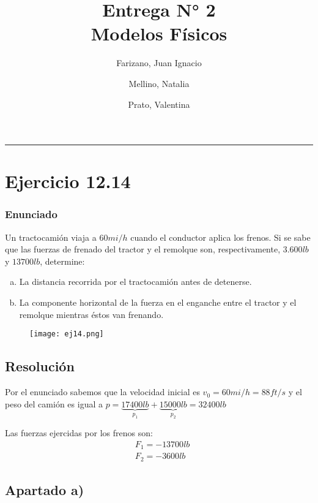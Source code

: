 \documentclass[11pt]{article}
\title{
  Entrega N° 2 \\
  \large Modelos Físicos
}
\author{
  Farizano, Juan Ignacio \\
  \and
  Mellino, Natalia \\
  \and
  Prato, Valentina
}
\date{}
\begin{document}
\maketitle
\noindent\rule{\textwidth}{1pt}

\section*{Ejercicio 12.14}

\subsubsection*{Enunciado}

Un tractocamión viaja a $60 mi/h$ cuando el conductor aplica los
frenos. Si se sabe que las fuerzas de frenado del tractor y el remolque son,
respectivamente, $3.600 lb$ y $13 700 lb$, determine:

\begin{enumerate}[a)]
  \item La distancia recorrida por el tractocamión antes de detenerse.
  \item La componente horizontal de la fuerza en el enganche entre el tractor
        y el remolque mientras éstos van frenando.
\end{enumerate}

\begin{figure}[h!]
  \begin{center}
    \texttt{[image: ej14.png]}
  \end{center}
\end{figure}

\subsection*{Resolución}

Por el enunciado sabemos que la velocidad inicial es $v_0 = 60mi/h = 88 ft/s$
y el peso del camión es igual a
$p = \underbrace{17400lb}_{p_1} + \underbrace{15000lb}_{p_2} = 32400lb$

Las fuerzas ejercidas por los frenos son:
\begin{align*}
  & F_1 = -13700lb \\
  & F_2 = -3600lb
\end{align*}

\subsection*{Apartado a)}
\end{document}
